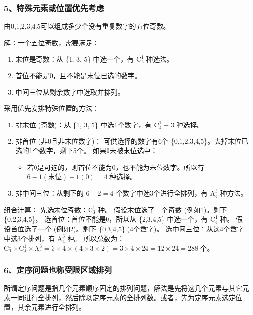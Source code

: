 \subsubsection{5、特殊元素或位置优先考虑}
\begin{example}
    由0,1,2,3,4,5可以组成多少个没有重复数字的五位奇数。
\end{example}
\begin{solution}
    解：一个五位奇数，需要满足：
    \begin{enumerate}
        \item 末位是奇数：从 \{1, 3, 5\} 中选一个，有 $\mathrm{C}_{3}^{1}$ 种选法。
        \item 首位不能是0，且不能是末位已选的数字。
        \item 中间三位从剩余数字中选取并排列。
    \end{enumerate}
    采用优先安排特殊位置的方法：
    \begin{enumerate}
        \item 排末位 (奇数)：从 \{1, 3, 5\} 中选1个数字，有 $\mathrm{C}_{3}^{1} = 3$ 种选择。
        \item 排首位 (非0且非末位数字)：
              可供选择的数字有6个 \{0,1,2,3,4,5\}。去掉末位已选的1个数字，剩下5个。
              如果0未被末位选中：
              \begin{itemize}
                  \item 若0是可选的，则首位不能为0，也不能为末位数字。所以有 $6-1(\text{末位})-1(0) = 4$ 种选择。
              \end{itemize}
        \item 排中间三位：从剩下的 $6-2=4$ 个数字中选3个进行全排列，有 $\mathrm{A}_{4}^{3}$ 种方法。
    \end{enumerate}
    组合计算：
    先选末位奇数：$\mathrm{C}_{3}^{1}$ 种。
    假设末位选了一个奇数 (例如1)。剩下 \{0,2,3,4,5\}。
    选首位：首位不能是0，所以从 \{2,3,4,5\} 中选一个，有 $\mathrm{C}_{4}^{1}$ 种。
    假设首位选了一个 (例如2)。剩下 \{0,3,4,5\} (4个数字)。
    选中间三位：从这4个数字中选3个排列，有 $\mathrm{A}_{4}^{3}$ 种。
    所以总数为：$\mathrm{C}_{3}^{1} \times \mathrm{C}_{4}^{1} \times \mathrm{A}_{4}^{3} = 3 \times 4 \times (4 \times 3 \times 2) = 3 \times 4 \times 24 = 12 \times 24 = 288$ 个。
\end{solution}

\subsubsection{6、定序问题\*也称受限区域排列}
所谓定序问题是指几个元素顺序固定的排列问题，解法是先将这几个元素与其它元素一同进行全排列，然后除以定序元素的全排列数。或者，先为定序元素选定位置，其余元素进行全排列。

